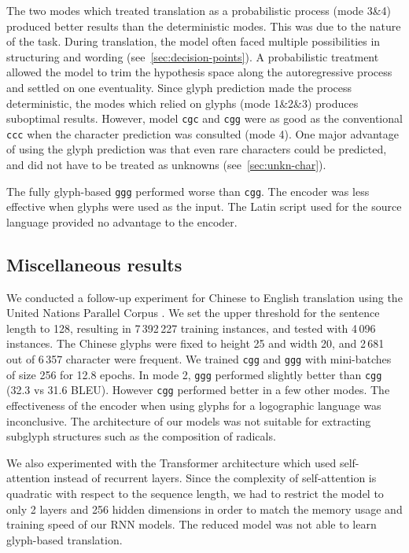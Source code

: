 \documentclass[11pt,twocolumn]{article}
\begin{document}
The two modes which treated translation as a probabilistic process (mode 3\&4)
produced better results than the deterministic modes.
This was due to the nature of the task.
During translation,
the model often faced multiple possibilities in structuring and wording (see~\ref{sec:decision-points}).
A probabilistic treatment allowed the model to trim the hypothesis space along the autoregressive process
and settled on one eventuality.
Since glyph prediction made the process deterministic,
the modes which relied on glyphs (mode 1\&2\&3) produces suboptimal results.
However, model \texttt{cgc} and \texttt{cgg} were as good as the conventional \texttt{ccc}
when the character prediction was consulted (mode 4).
One major advantage of using the glyph prediction was that even rare characters could be predicted,
and did not have to be treated as unknowns (see~\ref{sec:unkn-char}).

The fully glyph-based \texttt{ggg} performed worse than \texttt{cgg}.
The encoder was less effective when glyphs were used as the input.
The Latin script used for the source language provided no advantage to the encoder.

\subsection{Miscellaneous results}\label{sec:misc-results}

We conducted a follow-up experiment for Chinese to English translation
using the United Nations Parallel Corpus \parencite{ziemski2016united}.
We set the upper threshold for the sentence length to 128,
resulting in 7\,392\,227 training instances,
and tested with 4\,096 instances.
The Chinese glyphs were fixed to height 25 and width 20,
and 2\,681 out of 6\,357 character were frequent.
We trained \texttt{cgg} and \texttt{ggg} with mini-batches of size 256 for 12.8 epochs.
In mode 2, \texttt{ggg} performed slightly better than \texttt{cgg} (32.3 vs 31.6 BLEU).
However \texttt{cgg} performed better in a few other modes.
The effectiveness of the encoder when using glyphs for a logographic language was inconclusive.
The architecture of our models was not suitable for extracting subglyph structures
such as the composition of radicals.

We also experimented with the Transformer architecture \parencite{vaswani2017attention}
which used self-attention instead of recurrent layers.
Since the complexity of self-attention is quadratic with respect to the sequence length,
we had to restrict the model to only 2 layers and 256 hidden dimensions
in order to match the memory usage and training speed of our RNN models.
The reduced model was not able to learn glyph-based translation.
\end{document}
